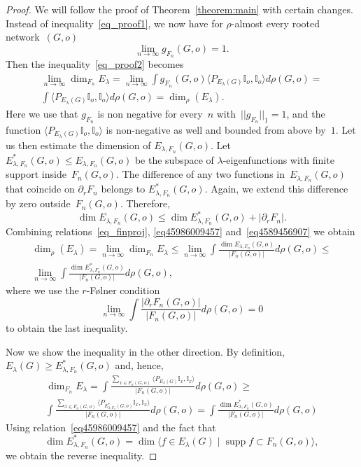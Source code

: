 \documentclass[english]{article}
\theoremstyle{definition}
\DeclareMathOperator{\supp}{supp}%
\begin{document}
\begin{proof}
    We will follow the proof of Theorem~\ref{theorem:main} with certain changes. Instead of inequality~\eqref{eq_proof1}, we now have for $\rho$-almost every rooted network~$(G,o)$
    $$
    \lim_{n \to \infty} g_{F_n}(G,o) = 1.
    $$
    Then the inequality~\eqref{eq_proof2} becomes
    \begin{multline}\label{eq45986009457}
        \lim_{n\to \infty} \dim_{F_n} E_\lambda = 
         \lim_{n\to \infty} \int g_{F_n}(G,o)\langle P_{E_\lambda(G)}\mathbb I_o, \mathbb I_o\rangle d \rho(G,o) = \\
        \int \langle P_{E_\lambda(G)}\mathbb I_o, \mathbb I_o\rangle d \rho(G,o) = 
    \dim_\rho (E_\lambda).
    \end{multline}
    Here we use that $g_{F_n}$ is non negative for every~$n$ with~$||g_{F_n}||_{1} =1$, and the function $\langle P_{E_\lambda(G)}\mathbb I_o, \mathbb I_o\rangle$ is non-negative as well and bounded from above by~$1$. 
    Let us then estimate the dimension of $E_{\lambda,F_n}(G,o)$. Let $E_{\lambda, F_n}^*(G,o) \le E_{\lambda,F_n}(G,o)$ be the subspace of $\lambda$-eigenfunctions with finite support inside~$F_n(G,o)$. The difference of any two functions in~$E_{\lambda,F_n}(G,o)$ that coincide on $\partial_r F_n$ belongs to $E_{\lambda, F_n}^*(G,o)$. Again, we extend this difference by zero outside~$F_n(G,o)$. Therefore, 
    \begin{equation}\label{eq4589456907}
        \dim E_{\lambda,F_n}(G,o) \le \dim
     E_{\lambda, F_n}^*(G,o) + |\partial_r F_n|.
    \end{equation}
    Combining relations~\eqref{eq_finproj}, \eqref{eq45986009457} and~\eqref{eq4589456907} we obtain 
    \begin{multline}
        \dim_\rho(E_\lambda) = 
        \lim_{n\to \infty} \dim_{F_n} E_\lambda \le 
        \lim_{n\to \infty} \int \frac{\dim {E_{\lambda,F_n}}(G,o)}{|F_n(G,o)|} d \rho (G,o) \le \\
        \lim_{n\to \infty} \int \frac{ \dim  E_{\lambda, F_n}^*(G,o)}{|F_n(G,o)|} d\rho(G,o), 
    \end{multline}
    where we use the $r$-F\o lner condition 
    $$
    \lim_{n\to\infty} \int \frac{|\partial_r F_n(G,o)|}{|F_n(G,o)|} d\rho(G,o) = 0
    $$
    to obtain the last inequality.
    
    Now we show the inequality in the other direction. By definition, $  E_\lambda(G) \ge E_{\lambda, F_n}^*(G,o)$ and, hence,
    \begin{multline}
        \dim_{F_n} E_\lambda = 
        \int \frac{\sum_{x \in F_n(G,o)}\langle P_{E_\lambda(G)} \mathbb{I}_x,\mathbb{I}_x \rangle}{|F_n(G,o)|}d\rho(G,o) \ge \\
        \int \frac{\sum_{x \in F_n(G,o)}\langle P_{E^*_{\lambda, F_n}(G,o)} \mathbb{I}_x,\mathbb{I}_x \rangle}{|F_n(G,o)|}d\rho(G,o) =
        \int \frac{\dim E^*_{\lambda, F_n}(G,o) }{|F_n(G,o)|}d\rho(G,o)
    \end{multline}
    Using relation~\eqref{eq45986009457} and the fact that 
    $$
    \dim E_{\lambda, F_n}^*(G,o) = \dim
    \langle f \in E_\lambda(G) \mid \supp f \subset F_n(G,o)\rangle, 
    $$
    we obtain the reverse inequality. 
\end{proof}
\end{document}
